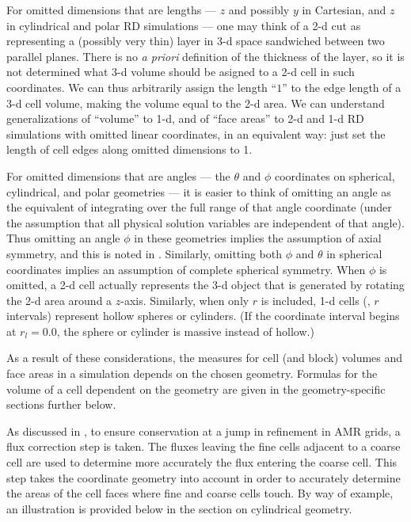 For omitted dimensions that are lengths --- $z$ and possibly $y$ in Cartesian,
and $z$ in cylindrical and polar RD simulations ---
one may think of a 2-d cut as representing a (possibly very thin) layer
in 3-d space sandwiched between two parallel planes.
There is no \textit{a priori\/} definition of the thickness of the layer,
so it is not determined what 3-d volume should be asigned to a 2-d cell
in such coordinates. We can thus arbitrarily assign the length ``$1$''
to the edge length of a 3-d cell volume, making the volume equal
to the 2-d area.
We can understand generalizations of ``volume'' to 1-d, and of ``face
areas'' to 2-d and 1-d RD simulations with omitted linear coordinates,
in an equivalent way: just set the length of cell edges along omitted
dimensions to 1.


For omitted dimensions that are angles --- the $\theta$ and $\phi$ coordinates
on spherical, cylindrical, and polar geometries ---
it is easier to think of omitting an angle as the equivalent of integrating
over the full range of that angle coordinate (under the assumption that
all physical solution variables are independent of that angle).
Thus omitting an angle $\phi$ in these geometries implies
the assumption of axial symmetry, and this is noted in .
Similarly, omitting both $\phi$ and $\theta$ in spherical coordinates
implies an assumption of complete spherical symmetry.
When $\phi$ is omitted, a 2-d cell actually represents the 3-d object
that is generated by rotating the 2-d area around a $z$-axis.
Similarly, when only $r$ is included, 1-d cells (\ie, $r$ intervals)
represent hollow spheres or cylinders.
(If the coordinate interval begins at $r_l=0.0$, the sphere or cylinder
is massive instead of hollow.)


As a result of these considerations,
the measures for cell (and block)
volumes and face areas in a simulation depends on the chosen geometry.
Formulas for the volume of a cell dependent on the geometry
are given in the geometry-specific sections further below.


As discussed in ,
to ensure conservation at a
jump in refinement in AMR grids, a flux correction step is taken.
The fluxes leaving the fine cells adjacent to a coarse cell are used
to determine more accurately the flux entering the coarse cell.
This step takes the coordinate geometry into account in order
to accurately determine the areas of the cell faces where
fine and coarse cells touch. By way of example,
an illustration is provided below in the
section on cylindrical geometry.


